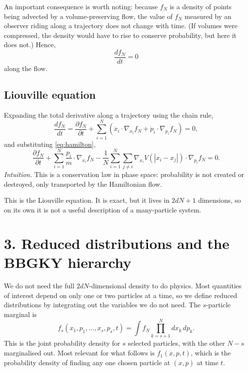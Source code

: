 \documentclass{article}
\begin{document}
An important consequence is worth noting: because \(f_N\) is a density of points being advected by a volume-preserving flow, the value of \(f_N\) measured by an observer riding along a trajectory does not change with time. (If volumes were compressed, the density would have to rise to conserve probability, but here it does not.) Hence,
\[
\frac{d f_N}{d t} = 0
\]
along the flow.

\subsection*{Liouville equation}

Expanding the total derivative along a trajectory using the chain rule,
\[
\frac{d f_N}{d t} = \frac{\partial f_N}{\partial t} + \sum_{i=1}^N \left( \dot{x}_i \cdot \nabla_{x_i} f_N + \dot{p}_i \cdot \nabla_{p_i} f_N \right) = 0,
\]
and substituting \eqref{eq:hamilton},
\begin{equation}
\boxed{\;\frac{\partial f_N}{\partial t} + \sum_{i=1}^N \frac{p_i}{m} \cdot \nabla_{x_i} f_N
- \frac{1}{N} \sum_{i=1}^N \sum_{j \neq i} \nabla_{x_i} V(|x_i - x_j|) \cdot \nabla_{p_i} f_N = 0.\;}
\label{eq:liouville}
\end{equation}
\noindent\emph{Intuition.} This is a conservation law in phase space: probability is not created or destroyed, only transported by the Hamiltonian flow.

This is the Liouville equation. It is exact, but it lives in \(2dN+1\) dimensions, so on its own it is not a useful description of a many-particle system.

\section*{3. Reduced distributions and the BBGKY hierarchy}

We do not need the full \(2dN\)-dimensional density to do physics. Most quantities of interest depend on only one or two particles at a time, so we define reduced distributions by integrating out the variables we do not need. The \(s\)-particle marginal is
\begin{equation}
f_s(x_1, p_1, \ldots, x_s, p_s, t) = \int f_N \prod_{k=s+1}^N dx_k\, dp_k.
\label{eq:fs}
\end{equation}
This is the joint probability density for \(s\) selected particles, with the other \(N-s\) marginalised out. Most relevant for what follows is \(f_1(x, p, t)\), which is the probability density of finding any one chosen particle at \((x, p)\) at time \(t\).
\end{document}
